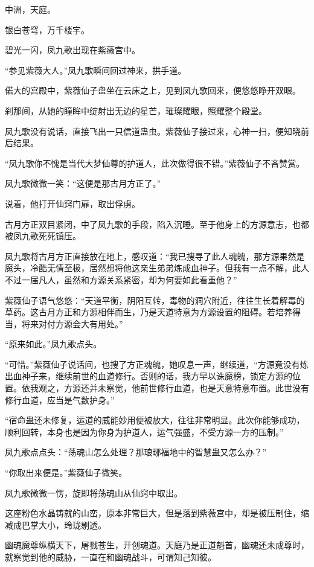 
\begin{this_body}

中洲，天庭。

银白苍穹，万千楼宇。

碧光一闪，凤九歌出现在紫薇宫中。

“参见紫薇大人。”凤九歌瞬间回过神来，拱手道。

偌大的宫殿中，紫薇仙子盘坐在云床之上，见到凤九歌回来，便悠悠睁开双眼。

刹那间，从她的瞳眸中绽射出无边的星芒，璀璨耀眼，照耀整个殿堂。

凤九歌没有说话，直接飞出一只信道蛊虫。紫薇仙子接过来，心神一扫，便知晓前后结果。

“凤九歌你不愧是当代大梦仙尊的护道人，此次做得很不错。”紫薇仙子不吝赞赏。

凤九歌微微一笑：“这便是那古月方正了。”

说着，他打开仙窍门扉，取出俘虏。

古月方正双目紧闭，中了凤九歌的手段，陷入沉睡。至于他身上的方源意志，也都被凤九歌死死镇压。

凤九歌将古月方正直接放在地上，感叹道：“我已搜寻了此人魂魄，那方源果然是魔头，冷酷无情至极，居然想将他这亲生弟弟炼成血神子。但我有一点不解，此人不过一届凡人，虽然和方源关系紧密，却为何要如此看重他？”

紫薇仙子语气悠悠：“天道平衡，阴阳互转，毒物的洞穴附近，往往生长着解毒的草药。这古月方正和方源相伴而生，乃是天道特意为方源设置的阻碍。若培养得当，将来对付方源会大有用处。”

“原来如此。”凤九歌点头。

“可惜。”紫薇仙子说话间，也搜了方正魂魄，她叹息一声，继续道，“方源竟没有炼出血神子来，继续前世的血道修行。否则的话，我方早以诛魔榜，锁定方源的位置。依我观之，方源还并未察觉，他前世修行血道，也是天意特意布置。此世没有修行血道，应当是气数护身。”

“宿命蛊还未修复，运道的威能妙用便被放大，往往非常明显。此次你能够成功，顺利回转，本身也是因为你身为护道人，运气强盛，不受方源一方的压制。”

凤九歌点点头：“荡魂山怎么处理？那琅琊福地中的智慧蛊又怎么办？”

“你取出来便是。”紫薇仙子微笑。

凤九歌微微一愣，旋即将荡魂山从仙窍中取出。

这座粉色水晶铸就的山峦，原本非常巨大，但是落到紫薇宫中，却是被压制住，缩减成巴掌大小，玲珑剔透。

幽魂魔尊纵横天下，屠戮苍生，开创魂道。天庭乃是正道魁首，幽魂还未成尊时，就察觉到他的威胁，一直在和幽魂战斗，可谓知己知彼。


\end{this_body}
